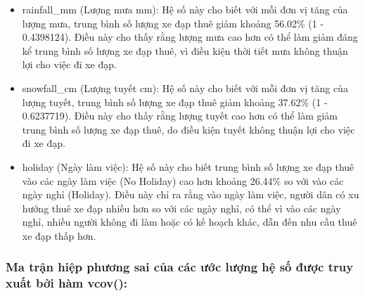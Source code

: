 \documentclass[
  11pt,
  letterpaper,
]{article}
\begin{document}
\begin{itemize}
\item rainfall\_mm (Lượng mưa mm): Hệ số này cho biết với mỗi đơn vị tăng của lượng mưa, trung bình số lượng xe đạp thuê giảm khoảng 56.02\% (1 - 0.4398124). Điều này cho thấy rằng lượng mưa cao hơn có thể làm giảm đáng kể trung bình số lượng xe đạp thuê, vì điều kiện thời tiết mưa không thuận lợi cho việc đi xe đạp.
\item snowfall\_cm (Lượng tuyết cm): Hệ số này cho biết với mỗi đơn vị tăng của lượng tuyết, trung bình số lượng xe đạp thuê giảm khoảng 37.62\% (1 - 0.6237719). Điều này cho thấy rằng lượng tuyết cao hơn có thể làm giảm trung bình số lượng xe đạp thuê, do điều kiện tuyết không thuận lợi cho việc đi xe đạp.
\item holiday (Ngày làm việc): Hệ số này cho biết trung bình số lượng xe đạp thuê vào các ngày làm việc (No Holiday) cao hơn khoảng 26.44\% so với vào các ngày nghỉ (Holiday). Điều này chỉ ra rằng vào ngày làm việc, người dân có xu hướng thuê xe đạp nhiều hơn so với các ngày nghỉ, có thể vì vào các ngày nghỉ, nhiều người không đi làm hoặc có kế hoạch khác, dẫn đến nhu cầu thuê xe đạp thấp hơn.
\end{itemize}
\subsubsection{Ma trận hiệp phương sai của các ước lượng hệ số được truy xuất bởi hàm vcov():}
\end{document}

